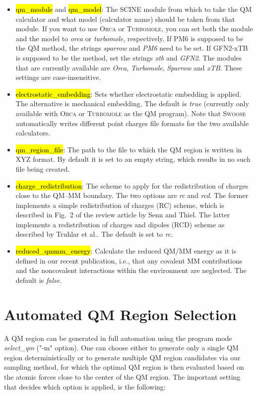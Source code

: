 \documentclass[]{tufte-book}
\begin{document}
{{\begin{itemize}
\item \hl{qm\_module} and \hl{qm\_model}: The SCINE module from which to take the QM calculator and what model (calculator name) should be taken from that module. If you want to use \textsc{Orca} or \textsc{Turbomole}, you can set both the module and the model to \textit{orca} or \textit{turbomole}, respectively. If PM6 is supposed to be the QM method, the strings \textit{sparrow} and \textit{PM6} need to be set. If GFN2-xTB is supposed to be the method, set the strings \textit{xtb} and \textit{GFN2}. The modules that are currently available are \textit{Orca}, \textit{Turbomole}, \textit{Sparrow} and \textit{xTB}. These settings are case-insensitive.
\item \hl{electrostatic\_embedding}: Sets whether electrostatic embedding is applied. The alternative is mechanical embedding. The default is \textit{true} (currently only available with \textsc{Orca} or \textsc{Turbomole} as the QM program). Note that \textsc{Swoose} automatically writes different point charges file formats for the two available calculators.
\item \hl{qm\_region\_file}: The path to the file to which the QM region is written in XYZ format. By default it is set to an empty string, which results in no such file being created.
\item \hl{charge\_redistribution}: The scheme to apply for the redistribution of charges close to the QM--MM boundary. The two options are \textit{rc} and \textit{rcd}. The former implements a simple redistribution of charges (RC) scheme, which is described in Fig.~2 of the review article by Senn and Thiel\cite{senn09}. The latter implements a redistribution of charges and dipoles (RCD) scheme as described by Truhlar et al.\cite{lin05}. The default is set to \textit{rc}.
\item \hl{reduced\_qmmm\_energy}: Calculate the reduced QM/MM energy as it is defined in our recent publication\cite{brunken21}, i.e., that any covalent MM contributions and the noncovalent interactions
within the environment are neglected. The default is \textit{false}.

\end{itemize}

\chapter{Automated QM Region Selection}\label{ch:select_qm}

A QM region can be generated in full automation using the program mode \textit{select\_qm} ("-m" option). One can choose either to generate only a single QM region deterministically or to generate multiple QM region candidates via our sampling method, for which the optimal QM region is then evaluated based on the atomic forces close to the center of the QM region.\cite{brunken21} The important setting that decides which option is applied, is the following:

}}
\end{document}
